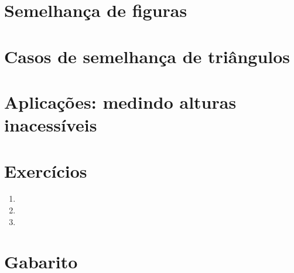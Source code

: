 \documentclass[11pt,a4paper]{article}
\begin{document}
\section{Semelhança de figuras}

\section{Casos de semelhança de triângulos}

\section{Aplicações: medindo alturas inacessíveis}


\section{Exercícios}
\begin{enumerate}[label=\textbf{\arabic*.}]
  \item %
  \item %
  \item %
\end{enumerate}

\begin{desafio}
\end{desafio}

\section*{Gabarito}
\end{document}
